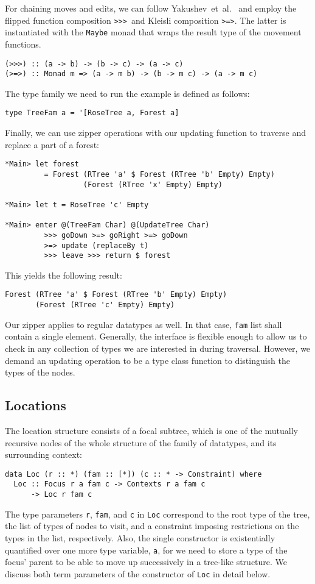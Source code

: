 \documentclass[runningheads]{llncs}
\newcommand{\K}[1]{\lstinline{#1}}
\begin{document}
For chaining moves and edits, we can follow Yakushev~et~al.~\cite{MuRec2009} and employ  the flipped function composition \K{>>>}~and Kleisli composition \K{>=>}. The latter is instantiated with the \K{Maybe} monad that wraps the result type of the movement functions.
\begin{lstlisting}
(>>>) :: (a -> b) -> (b -> c) -> (a -> c)
(>=>) :: Monad m => (a -> m b) -> (b -> m c) -> (a -> m c)
\end{lstlisting}

The type family we need to run the example is defined as follows:
\begin{lstlisting}
type TreeFam a = '[RoseTree a, Forest a]
\end{lstlisting}

Finally, we can use zipper operations with our updating function to traverse and replace a part of a forest:
\begin{lstlisting}
*Main> let forest
         = Forest (RTree 'a' $ Forest (RTree 'b' Empty) Empty)
                  (Forest (RTree 'x' Empty) Empty)

*Main> let t = RoseTree 'c' Empty

*Main> enter @(TreeFam Char) @(UpdateTree Char)
         >>> goDown >=> goRight >=> goDown
         >=> update (replaceBy t)
         >>> leave >>> return $ forest
\end{lstlisting}
This yields the following result:
\begin{lstlisting}
Forest (RTree 'a' $ Forest (RTree 'b' Empty) Empty)
       (Forest (RTree 'c' Empty) Empty)
\end{lstlisting}

Our zipper applies to regular datatypes as well. In that case, \K{fam} list shall contain a single element. Generally, the interface is flexible enough to allow us to check in any collection of types we are interested in during traversal. However, we demand an updating operation to be a type class function to distinguish the types of the nodes.

\subsection{Locations}
\label{ss:locs}

The location structure consists of a focal subtree, which is one of the mutually recursive nodes of the whole structure of the family of datatypes, and its surrounding context:
\begin{lstlisting}
data Loc (r :: *) (fam :: [*]) (c :: * -> Constraint) where
  Loc :: Focus r a fam c -> Contexts r a fam c
      -> Loc r fam c
\end{lstlisting}
The type parameters \K{r}, \K{fam}, and \K{c} in \K{Loc} correspond to the root type of the tree, the list of types of nodes to visit, and a constraint imposing restrictions on the types in the list, respectively. Also, the single constructor is existentially quantified over one more type variable, \K{a}, for we need to store a type of the focus' parent to be able to move up successively in a tree-like structure. We discuss both term parameters of the constructor of \K{Loc} in detail below. 
\end{document}
